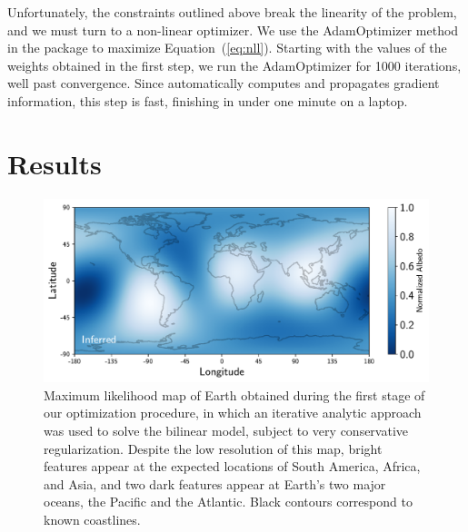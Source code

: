 \documentclass[modern]{aastex62}
\begin{document}
Unfortunately, the constraints outlined above break the linearity 
of the problem, and we must turn to a non-linear optimizer. We use the 
\textsf{AdamOptimizer} method in the \tf package \citep{Abadi2015}
to maximize Equation~(\ref{eq:nll}). Starting with the values of the
weights obtained in the first step, we run the \textsf{AdamOptimizer}
for 1000 iterations, well past convergence. Since \tf automatically
computes and propagates gradient information, this step is fast, 
finishing in under one minute on a laptop.

\section{Results}
\label{sec:results}

\begin{figure}[t!]
    \begin{centering}
    \includegraphics[width=\linewidth]{figures/map_L2.pdf}
    \caption{\label{fig:map_L2}
             Maximum likelihood map of Earth obtained during the first
             stage of our optimization procedure, in which an iterative
             analytic approach was used to solve the bilinear model, 
             subject to very conservative regularization. Despite the low
             resolution of this map, bright features appear at the 
             expected locations of South America, Africa, and Asia, 
             and two dark features appear at Earth's
             two major oceans, the Pacific and the Atlantic. 
	          Black contours correspond to known coastlines. 
             }
    \end{centering}
\end{figure}
\end{document}

